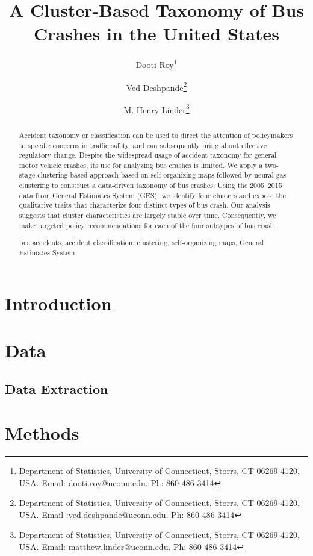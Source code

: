 \documentclass[11pt]{asaproc}
\title{ A Cluster-Based Taxonomy of Bus Crashes in the United States }
\author{Dooti Roy\thanks{Department of Statistics, University of Connecticut, Storrs, CT 06269-4120, USA. Email: dooti.roy@uconn.edu. Ph: 860-486-3414} \and  Ved Deshpande\thanks{Department of Statistics, University of Connecticut, Storrs, CT 06269-4120, USA. Email :ved.deshpande@uconn.edu. Ph: 860-486-3414} \and  M. Henry Linder\thanks{Department of Statistics, University of Connecticut, Storrs, CT 06269-4120, USA. Email: matthew.linder@uconn.edu. Ph: 860-486-3414}}
\begin{document}
\maketitle

\begin{abstract}
Accident taxonomy or classification can be used to direct the attention of policymakers to specific concerns in traffic safety, and can subsequently bring about effective regulatory change. Despite the widespread usage of accident taxonomy for general motor vehicle crashes, its use for analyzing bus crashes is limited. We apply a two-stage clustering-based approach based on self-organizing maps followed by neural gas clustering to construct a data-driven taxonomy of bus crashes. Using the 2005--2015 data from General Estimates System (GES), we identify four clusters and expose the qualitative traits that characterize four distinct types of bus crash. Our analysis suggests that cluster characteristics are largely stable over time. Consequently, we make targeted policy recommendations for each of the four subtypes of bus crash.
\begin{keywords}
bus accidents, accident classification, clustering, self-organizing maps, General Estimates System
\end{keywords}
\end{abstract}

\section{Introduction}
	


\section{Data} \label{sec:data}



\subsection{Data Extraction} \label{sec:extract}



\section{Methods} \label{sec:methods}


\end{document}
